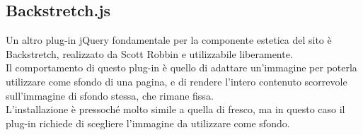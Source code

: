 \subsection{Backstretch.js}\label{bs}

Un altro plug-in jQuery fondamentale per la componente estetica del sito è Backstretch, realizzato da Scott Robbin e utilizzabile liberamente.\\
Il comportamento di questo plug-in è quello di adattare un'immagine per poterla utilizzare come sfondo di una pagina, e di rendere l'intero contenuto scorrevole sull'immagine di sfondo stessa, che rimane fissa.\\
L'installazione è pressoché molto simile a quella di fresco, ma in questo caso il plug-in richiede di scegliere l'immagine da utilizzare come sfondo.







